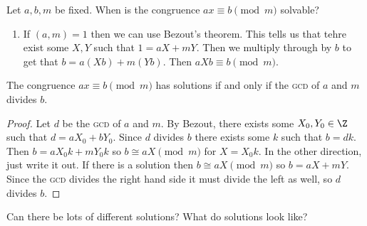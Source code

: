 \begin{problem}
Let $a,b,m$ be fixed.
When is the congruence $ax \equiv b \pmod{m}$ solvable?
\end{problem}

\begin{enumerate}[label=\textbf{Obs. \arabic*.}]
\item If $(a,m)=1$ then we can use Bezout's theorem. This tells us that tehre exist some $X,Y$ such that $1 = aX + mY$. Then we multiply through by $b$ to get that $b = a(Xb) + m(Yb)$. Then $aXb \equiv b \pmod{m}$.
\end{enumerate}

\begin{lemma}
The congruence $ax \equiv b \pmod{m}$ has solutions if and only if the \textsc{gcd} of $a$ and $m$ divides $b$.
\end{lemma}

\begin{proof}
Let $d$ be the \textsc{gcd} of $a$ and $m$. By Bezout, there exists some $X_0, Y_0 \in \Z$ such that $d = aX_0 + bY_0$. Since $d$ divides $b$ there exists some $k$ such that $b = dk$. Then $b = aX_0k + mY_0k$ so $b \cong aX \pmod{m}$ for $X = X_0k$. In the other direction, just write it out. If there is a solution then $b \cong aX \pmod{m}$ so $b = aX + mY$. Since the \textsc{gcd} divides the right hand side it must divide the left as well, so $d$ divides $b$.
\end{proof}

\begin{problem}
Can there be lots of different solutions? What do solutions look like?
\end{problem}